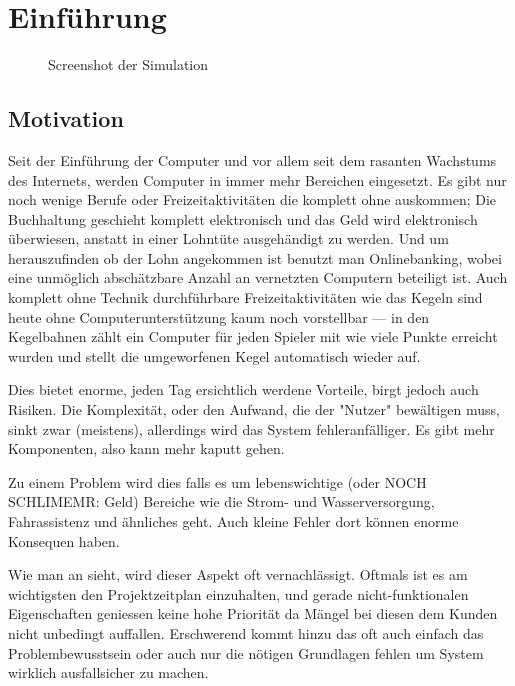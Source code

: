 \clearpage
\section{Einf{\"{u}}hrung}
\begin{figure}
	\centering
	\caption{Screenshot der Simulation}
	\label{fig:simulation}
\end{figure}

\subsection{Motivation} Seit der Einf{\"{u}}hrung der Computer und vor allem seit dem rasanten Wachstums des
Internets, werden Computer in immer mehr Bereichen eingesetzt. Es gibt nur noch wenige Berufe oder 
Freizeitaktivit{\"{a}}ten die komplett ohne auskommen; Die Buchhaltung geschieht komplett elektronisch und
das Geld wird elektronisch {\"{u}}berwiesen, anstatt in einer Lohnt{\"{u}}te ausgeh{\"{a}}ndigt zu werden.
Und um herauszufinden ob der Lohn angekommen ist benutzt man Onlinebanking, wobei eine
unm{\"{o}}glich absch{\"{a}}tzbare Anzahl an vernetzten Computern beteiligt ist. Auch komplett ohne Technik
durchf{\"{u}}hrbare Freizeitaktivit{\"{a}}ten wie das Kegeln sind heute ohne Computerunterst{\"{u}}tzung
kaum noch vorstellbar --- in den Kegelbahnen z{\"{a}}hlt ein Computer f{\"{u}}r jeden Spieler mit wie viele
Punkte erreicht wurden und stellt die umgeworfenen Kegel automatisch wieder auf.

Dies bietet enorme, jeden Tag ersichtlich werdene Vorteile, birgt jedoch auch Risiken. Die Komplexit{\"{a}}t,
oder den Aufwand, die der "Nutzer" bew{\"{a}}ltigen muss, sinkt zwar (meistens), allerdings wird das
System fehleranf{\"{a}}lliger. Es gibt mehr Komponenten, also kann mehr kaputt gehen.

Zu einem Problem wird dies falls es um lebenswichtige (oder NOCH SCHLIMEMR: Geld) Bereiche wie die
Strom- und Wasserversorgung, Fahrassistenz und {\"{a}}hnliches geht. Auch kleine Fehler dort k{\"{o}}nnen
enorme Konsequen haben. 

Wie man an  sieht, wird dieser Aspekt oft vernachl{\"{a}}ssigt. Oftmals ist es am wichtigsten den
Projektzeitplan einzuhalten, und gerade nicht-funktionalen Eigenschaften geniessen keine hohe Priorit{\"{a}}t da M{\"{a}}ngel
bei diesen dem Kunden nicht unbedingt auffallen. Erschwerend kommt hinzu das oft auch einfach das Problembewusstsein oder auch nur die
n{\"{o}}tigen Grundlagen fehlen um System wirklich ausfallsicher zu machen.


